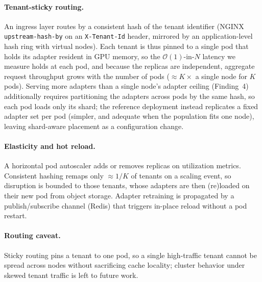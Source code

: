 \documentclass[11pt]{article}
\begin{document}
\paragraph{Tenant-sticky routing.}
An ingress layer routes by a consistent hash of the tenant identifier
(NGINX \texttt{upstream-hash-by} on an \texttt{X-Tenant-Id} header, mirrored by
an application-level hash ring with virtual nodes). Each tenant is thus pinned
to a single pod that holds its adapter resident in GPU memory, so the
$\mathcal{O}(1)$-in-$N$ latency we measure holds at each pod, and because the
replicas are independent, aggregate request throughput grows with the number of
pods ($\approx\!K\times$ a single node for $K$ pods). Serving more adapters than a single
node's adapter ceiling (Finding~4)
additionally requires
partitioning the adapters across pods by the same hash, so each pod loads only its
shard; the reference deployment instead replicates a fixed adapter set per
pod (simpler, and adequate when the population fits one node), leaving
shard-aware placement as a configuration change.

\paragraph{Elasticity and hot reload.}
A horizontal pod autoscaler adds or removes replicas on utilization metrics.
Consistent hashing remaps only $\approx\!1/K$ of tenants on a scaling event, so
disruption is bounded to those tenants, whose adapters are then (re)loaded on
their new pod from object storage. Adapter retraining is propagated by a
publish/subscribe channel (Redis) that triggers in-place reload without a pod
restart.

\paragraph{Routing caveat.}
Sticky routing pins a tenant to one pod, so a single high-traffic tenant cannot
be spread across nodes without sacrificing cache locality; cluster behavior
under skewed tenant traffic is left to future work.
\end{document}
